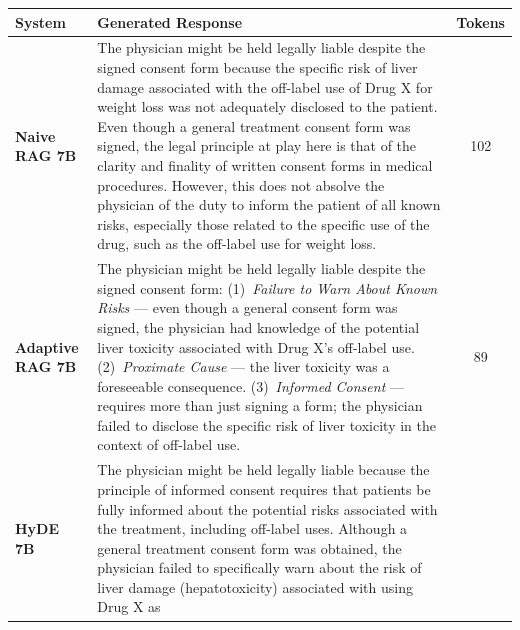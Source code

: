 \documentclass[a4paper,fleql]{cas-sc}
\begin{document}
\vspace{6pt}
\begin{center}
\begingroup
{}
\label{tab:casestudy_comparison}
\renewcommand{\arraystretch}{1.5}
\small
\begin{tabular}{p{2.3cm} | p{10.2cm} | c}
\toprule
\textbf{System} & \textbf{Generated Response} & \textbf{Tokens} \\
\midrule
\textbf{Naive RAG 7B}
& The physician might be held legally liable despite the signed consent form
because the specific risk of liver damage associated with the off-label use of
Drug X for weight loss was not adequately disclosed to the patient. Even though
a general treatment consent form was signed, the legal principle at play here
is that of the clarity and finality of written consent forms in medical
procedures. However, this does not absolve the physician of the duty to inform
the patient of all known risks, especially those related to the specific use of
the drug, such as the off-label use for weight loss. & 102 \\
\midrule
\textbf{Adaptive RAG 7B}
& The physician might be held legally liable despite the signed consent form:
(1)~\textit{Failure to Warn About Known Risks} --- even though a general
consent form was signed, the physician had knowledge of the potential liver
toxicity associated with Drug X's off-label use.
(2)~\textit{Proximate Cause} --- the liver toxicity was a foreseeable
consequence.
(3)~\textit{Informed Consent} --- requires more than just signing a form; the
physician failed to disclose the specific risk of liver toxicity in the context
of off-label use. & 89 \\
\midrule
\textbf{HyDE 7B}
& The physician might be held legally liable because the principle of informed
consent requires that patients be fully informed about the potential risks
associated with the treatment, including off-label uses. Although a general
treatment consent form was obtained, the physician failed to specifically warn
about the risk of liver damage (hepatotoxicity) associated with using Drug X as

\end{tabular}
\end{center}
\end{document}
